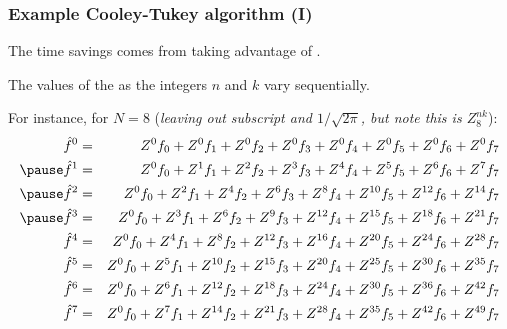 \documentclass[hyperref={colorlinks=true}]{beamer}
\begin{document}
\begin{frame}%
  \frametitle{Example Cooley-Tukey algorithm (I)}
  
  The time savings comes from taking advantage of . 
  
  \mysp
  
  The values of the  as the integers $n$ and $k$ vary sequentially. 
  
  \mysp
  
  For instance, for $N = 8$ 
  {\footnotesize (\textit{leaving out subscript and $1/\sqrt{2\pi}$, but note this is $Z_8^{nk}$})}: \pause
  \begin{eqnarray}
    \hat{f}^0 &=& Z^{0} f_{0} + Z^{0} f_{1} + Z^{0} f_{2} + Z^{0} f_{3} + Z^{0} f_{4} + Z^{0} f_{5} + Z^{0} f_{6} + Z^{0} f_{7} \nonumber \\ \pause
    \hat{f}^1 &=& Z^{0} f_{0} + Z^{1} f_{1} + Z^{2} f_{2} + Z^{3} f_{3} + Z^{4} f_{4} + Z^{5} f_{5} + Z^{6} f_{6} + Z^{7} f_{7} \nonumber\\ \pause
    \hat{f}^2 &=& Z^{0} f_{0} + Z^{2} f_{1} + Z^{4} f_{2} + Z^{6} f_{3} + Z^{8} f_{4} + Z^{10} f_{5} + Z^{12} f_{6} + Z^{14} f_{7} \nonumber \\ \pause
    \hat{f}^3 &=& Z^{0} f_{0} + Z^{3} f_{1} + Z^{6} f_{2} + Z^{9} f_{3} + Z^{12} f_{4} + Z^{15} f_{5} + Z^{18} f_{6} + Z^{21} f_{7} \nonumber \\ 
    \hat{f}^4 &=& Z^{0} f_{0} + Z^{4} f_{1} + Z^{8} f_{2} + Z^{12} f_{3} + Z^{16} f_{4} + Z^{20} f_{5} + Z^{24} f_{6} + Z^{28} f_{7} \nonumber \\
    \hat{f}^5 &=& Z^{0} f_{0} + Z^{5} f_{1} + Z^{10} f_{2} + Z^{15} f_{3} + Z^{20} f_{4} + Z^{25} f_{5} + Z^{30} f_{6} + Z^{35} f_{7} \nonumber \\
    \hat{f}^6 &=& Z^{0} f_{0} + Z^{6} f_{1} + Z^{12} f_{2} + Z^{18} f_{3} + Z^{24} f_{4} + Z^{30} f_{5} + Z^{36} f_{6} + Z^{42} f_{7} \nonumber \\
    \hat{f}^7 &=& Z^{0} f_{0} + Z^{7} f_{1} + Z^{14} f_{2} + Z^{21} f_{3} + Z^{28} f_{4} + Z^{35} f_{5} + Z^{42} f_{6} + Z^{49} f_{7} \nonumber
  \end{eqnarray}

\end{frame}

\end{document}
